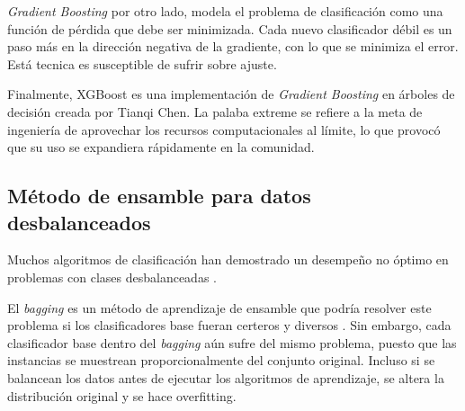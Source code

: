\textit{Gradient Boosting} por otro lado, modela el problema de clasificación como una función de pérdida que debe ser minimizada. Cada nuevo clasificador débil es un paso más en la dirección negativa de la gradiente, con lo que se minimiza el error. Está tecnica es susceptible de sufrir sobre ajuste.

Finalmente, XGBoost es una implementación de \textit{Gradient Boosting} en árboles de decisión creada por Tianqi Chen. La palaba extreme se refiere a la meta de ingeniería de aprovechar los recursos computacionales al límite, lo que provocó que su uso se expandiera rápidamente en la comunidad.



\subsection{Método de ensamble para datos desbalanceados}


Muchos algoritmos de clasificación han demostrado un desempeño no óptimo en problemas con clases desbalanceadas \citep{batista2004study, mani2003knn, seiffert2010rusboost}.

El \textit{bagging} es un método de aprendizaje de ensamble que podría resolver este problema si los clasificadores base fueran certeros y diversos \citep{breiman1996bagging}. Sin embargo, cada clasificador base dentro del \textit{bagging} aún sufre del mismo problema, puesto que las instancias se muestrean proporcionalmente del conjunto original. Incluso si se balancean los datos antes de ejecutar los algoritmos de aprendizaje, se altera la distribución original y se hace overfitting.


